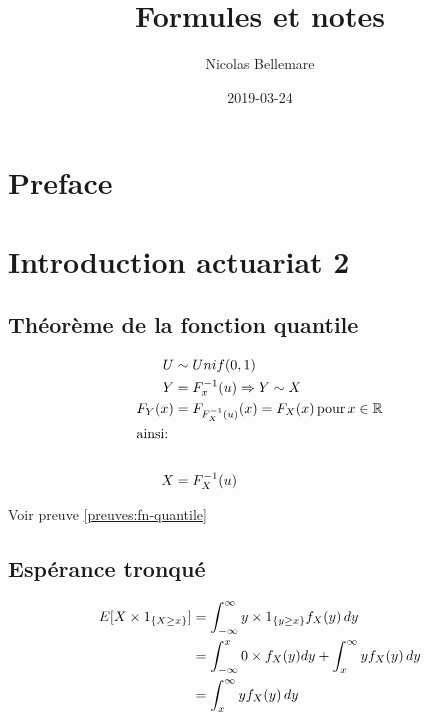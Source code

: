 \documentclass[]{book}
\title{Formules et notes}
\author{Nicolas Bellemare}
\date{2019-03-24}
\theoremstyle{definition}
\theoremstyle{definition}
\theoremstyle{definition}
\theoremstyle{remark}
\let\BeginKnitrBlock\begin \let\EndKnitrBlock\end
\begin{document}
\maketitle

{
\setcounter{tocdepth}{1}
\tableofcontents
}
\chapter*{Preface}\label{preface}

\chapter{Introduction actuariat 2}\label{introduction-actuariat-2}

\section{Théorème de la fonction
quantile}\label{theoreme-de-la-fonction-quantile}

\BeginKnitrBlock{theorem}
\protect\hypertarget{thm:fn-quantile}{}{\label{thm:fn-quantile} }

\begin{align*}
U &\sim Unif(0,1)\\
Y &=F_x^{-1}(u) \Rightarrow Y \sim X\\
F_Y(x) &=F_{F_X^{-1}(u)}(x)=F_X(x)\, \text{pour}\, x \in \mathbb{R}\\
\intertext{ainsi:}\\
X &=F_X^{-1}(u)
\end{align*}

Voir preuve \ref{preuves:fn-quantile}
\EndKnitrBlock{theorem}

\section{Espérance tronqué}\label{intro:espuxe9tron}

\begin{gather*}
\begin{align*}
E[X \times \mathrm{1}_{ \{ X \ge x \} }]& =\int_{-\infty}^\infty y \times \mathrm{1}_{ \{ y \ge x\}}f_X(y)\, dy \notag \\ 
& =\int_{-\infty}^x 0\times f_X(y) dy + \int_x^\infty y f_X(y)\,dy \notag \\
& =\int_x^\infty y f_X(y)\,dy 
\end{align*}
\end{gather*}
\end{document}
